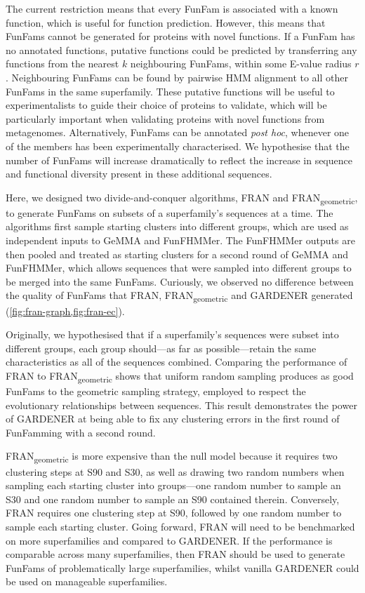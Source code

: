 The current restriction means that every FunFam is associated with a known function, which is useful for function prediction.
However, this means that FunFams cannot be generated for proteins with novel functions.
If a FunFam has no annotated functions, putative functions could be predicted by transferring any functions from the nearest $k$ neighbouring FunFams, within some E-value radius $r$.
Neighbouring FunFams can be found by pairwise HMM alignment to all other FunFams in the same superfamily.
These putative functions will be useful to experimentalists to guide their choice of proteins to validate, which will be particularly important when validating proteins with novel functions from metagenomes.
Alternatively, FunFams can be annotated \emph{post hoc}, whenever one of the members has been experimentally characterised.
We hypothesise that the number of FunFams will increase dramatically to reflect the increase in sequence and functional diversity present in these additional sequences.

Here, we designed two divide-and-conquer algorithms, FRAN and FRAN\textsubscript{geometric}, to generate FunFams on subsets of a superfamily's sequences at a time. The algorithms first sample starting clusters into different groups, which are used as independent inputs to GeMMA and FunFHMMer. The FunFHMMer outputs are then pooled and treated as starting clusters for a second round of GeMMA and FunFHMMer, which allows sequences that were sampled into different groups to be merged into the same FunFams. Curiously, we observed no difference between the quality of FunFams that FRAN, FRAN\textsubscript{geometric} and GARDENER generated (\ref{fig:fran-graph,fig:fran-ec}).

Originally, we hypothesised that if a superfamily's sequences were subset into different groups, each group should---as far as possible---retain the same characteristics as all of the sequences combined. Comparing the performance of FRAN to FRAN\textsubscript{geometric} shows that uniform random sampling produces as good FunFams to the geometric sampling strategy, employed to respect the evolutionary relationships between sequences. This result demonstrates the power of GARDENER at being able to fix any clustering errors in the first round of FunFamming with a second round.

FRAN\textsubscript{geometric} is more expensive than the null model because it requires two clustering steps at S90 and S30, as well as drawing two random numbers when sampling each starting cluster into groups---one random number to sample an S30 and one random number to sample an S90 contained therein. Conversely, FRAN requires one clustering step at S90, followed by one random number to sample each starting cluster. Going forward, FRAN will need to be benchmarked on more superfamilies and compared to GARDENER. If the performance is comparable across many superfamilies, then FRAN should be used to generate FunFams of problematically large superfamilies, whilst vanilla GARDENER could be used on manageable superfamilies.

